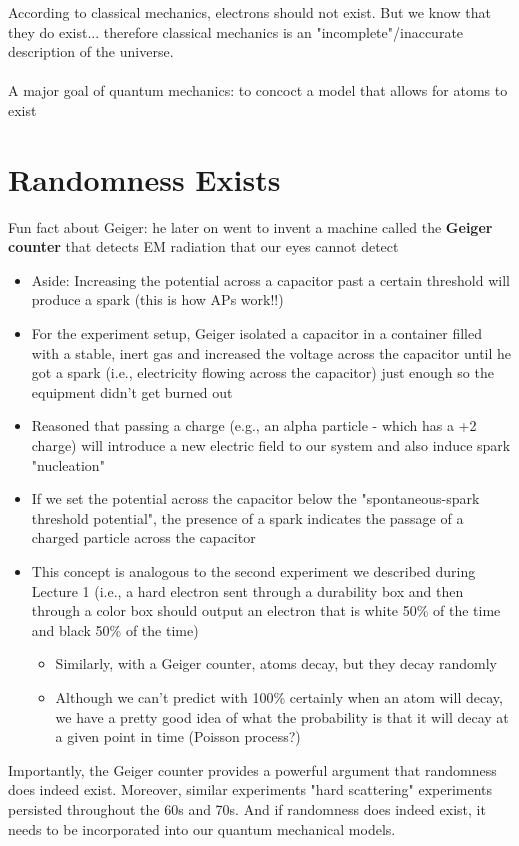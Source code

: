\documentclass[a4paper]{article}
\begin{document}
According to classical mechanics, electrons should not exist. But we know that they do exist... therefore classical mechanics is an "incomplete"/inaccurate description of the universe. 
\\
\\
A major goal of quantum mechanics: to concoct a model that allows for atoms to exist
\section{Randomness Exists}
Fun fact about Geiger: he later on went to invent a machine called the \textbf{Geiger counter} that detects EM radiation that our eyes cannot detect 
\begin{itemize}
    \item Aside: Increasing the potential across a capacitor past a certain threshold will produce a spark (this is how APs work!!) 
    \item For the experiment setup, Geiger isolated a capacitor in a container filled with a stable, inert gas and increased the voltage across the capacitor until he got a spark (i.e., electricity flowing across the capacitor) just enough so the equipment didn't get burned out
    \item Reasoned that passing a charge (e.g., an alpha particle - which has a +2 charge) will introduce a new electric field to our system and also induce spark "nucleation"
    \item If we set the potential across the capacitor below the "spontaneous-spark threshold potential", the presence of a spark indicates the passage of a charged particle across the capacitor 
    \item This concept is analogous to the second experiment we described during Lecture 1 (i.e., a hard electron sent through a durability box and then through a color box should output an electron that is white 50\% of the time and black 50\% of the time)  
    \begin{itemize}
        \item Similarly, with a Geiger counter, atoms decay, but they decay randomly
        \item Although we can't predict with 100\% certainly when an atom will decay, we have a pretty good idea of what the probability is that it will decay at a given point in time (Poisson process?) 
    \end{itemize}
\end{itemize}
Importantly, the Geiger counter provides a powerful argument that randomness does indeed exist. Moreover, similar experiments "hard scattering" experiments persisted throughout the 60s and 70s. And if randomness does indeed exist, it needs to be incorporated into our quantum mechanical models. 
\end{document}
